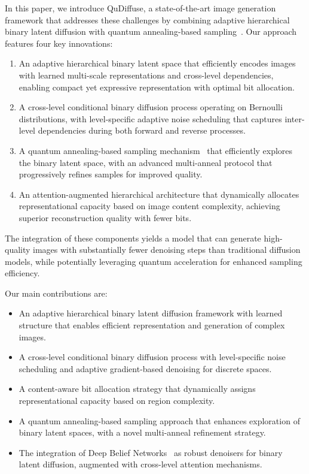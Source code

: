 \documentclass[10pt,twocolumn,letterpaper]{article}
\begin{document}
In this paper, we introduce QuDiffuse, a state-of-the-art image generation framework that addresses these challenges by combining adaptive hierarchical binary latent diffusion with quantum annealing-based sampling~\cite{kadowaki1998quantum}. Our approach features four key innovations:

\begin{enumerate}
    \item An adaptive hierarchical binary latent space that efficiently encodes images with learned multi-scale representations and cross-level dependencies, enabling compact yet expressive representation with optimal bit allocation.
    \item A cross-level conditional binary diffusion process operating on Bernoulli distributions, with level-specific adaptive noise scheduling that captures inter-level dependencies during both forward and reverse processes.
    \item A quantum annealing-based sampling mechanism~\cite{kirkpatrick1983optimization, kadowaki1998quantum} that efficiently explores the binary latent space, with an advanced multi-anneal protocol that progressively refines samples for improved quality.
    \item An attention-augmented hierarchical architecture that dynamically allocates representational capacity based on image content complexity, achieving superior reconstruction quality with fewer bits.
\end{enumerate}

The integration of these components yields a model that can generate high-quality images with substantially fewer denoising steps than traditional diffusion models, while potentially leveraging quantum acceleration for enhanced sampling efficiency. 

Our main contributions are:
\begin{itemize}
    \item An adaptive hierarchical binary latent diffusion framework with learned structure that enables efficient representation and generation of complex images.
    \item A cross-level conditional binary diffusion process with level-specific noise scheduling and adaptive gradient-based denoising for discrete spaces.
    \item A content-aware bit allocation strategy that dynamically assigns representational capacity based on region complexity.
    \item A quantum annealing-based sampling approach that enhances exploration of binary latent spaces, with a novel multi-anneal refinement strategy.
    \item The integration of Deep Belief Networks~\cite{hinton2006fast, hinton2009dbn} as robust denoisers for binary latent diffusion, augmented with cross-level attention mechanisms.
\end{itemize}
\end{document}
